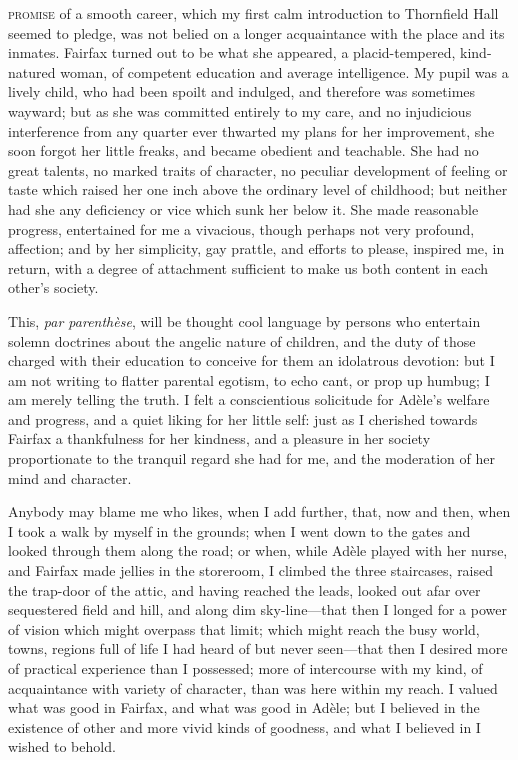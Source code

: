 
 \textsc{promise} of a smooth career, which my first calm introduction to
Thornfield Hall seemed to pledge, was not belied on a longer
acquaintance with the place and its inmates. \Mrs{} Fairfax turned out to
be what she appeared, a placid-tempered, kind-natured woman, of
competent education and average intelligence. My pupil was a lively
child, who had been spoilt and indulged, and therefore was sometimes
wayward; but as she was committed entirely to my care, and no
injudicious interference from any quarter ever thwarted my plans for her
improvement, she soon forgot her little freaks, and became obedient and
teachable. She had no great talents, no marked traits of character, no
peculiar development of feeling or taste which raised her one inch above
the ordinary level of childhood; but neither had she any deficiency or
vice which sunk her below it. She made reasonable progress, entertained
for me a vivacious, though perhaps not very profound, affection; and by
her simplicity, gay prattle, and efforts to please, inspired me, in
return, with a degree of attachment sufficient to make us both content
in each other's society.

This, \foreignlanguage{french}{\emph{par parenthèse}}, will be thought cool language by persons
who entertain solemn doctrines about the angelic nature of children, and
the duty of those charged with their education to conceive for them an
idolatrous devotion: but I am not writing to flatter parental egotism,
to echo cant, or prop up humbug; I am merely telling the truth. I felt
a conscientious solicitude for Adèle's welfare and progress, and a quiet
liking for her little self: just as I cherished towards \Mrs{} Fairfax a
thankfulness for her kindness, and a pleasure in her society
proportionate to the tranquil regard she had for me, and the moderation
of her mind and character.

Anybody may blame me who likes, when I add further, that, now and then,
when I took a walk by myself in the grounds; when I went down to the
gates and looked through them along the road; or when, while Adèle
played with her nurse, and \Mrs{} Fairfax made jellies in the storeroom, I
climbed the three staircases, raised the trap-door of the attic, and
having reached the leads, looked out afar over sequestered field and
hill, and along dim sky-line---that then I longed for a power of vision
which might overpass that limit; which might reach the busy world,
towns, regions full of life I had heard of but never seen---that then I
desired more of practical experience than I possessed; more of
intercourse with my kind, of acquaintance with variety of character,
than was here within my reach. I valued what was good in \Mrs{} Fairfax,
and what was good in Adèle; but I believed in the existence of other and
more vivid kinds of goodness, and what I believed in I wished to behold.

